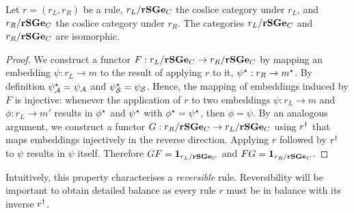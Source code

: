 \begin{lemma}
  Let $r = (r_L, r_R)$ be a rule,
  $r_L/\mathbf{rSGe}_C$ the coslice category under $r_L$, and
  $r_R/\mathbf{rSGe}_C$ the coslice category under $r_R$.
  The categories $r_L/\mathbf{rSGe}_C$ and $r_R/\mathbf{rSGe}_C$ are isomorphic.
\end{lemma}
\begin{proof}
  We construct a functor $F: r_L/\mathbf{rSGe}_C \to r_R/\mathbf{rSGe}_C$
  by mapping an embedding $\psi: r_L \to m$
  to the result of applying $r$ to it,
  $\psi^\star: r_R \to m^\star$.
  By definition $\psi^\star_{\mathcal{A}} = \psi_{\mathcal{A}}$ and
  $\psi^\star_{\mathcal{S}} = \psi_{\mathcal{S}}$.
  Hence, the mapping of embeddings induced by $F$ is injective:
  whenever the application of $r$ to two embeddings
  $\psi: r_L \to m$ and $\phi: r_L \to m'$
  results in $\phi^\star$ and $\psi^\star$
  with $\phi^\star = \psi^\star$,
  then $\phi = \psi$.
  By an analogous argument, we construct a functor
  $G: r_R/\mathbf{rSGe}_C \to r_L/\mathbf{rSGe}_C$ using $r^\dagger$ that
  maps embeddings injectively in the reverse direction.
  Applying $r$ followed by $r^\dagger$ to $\psi$
  results in $\psi$ itself.
  Therefore $GF = \boldsymbol{\mathbf{1}}_{r_L/\mathbf{rSGe}_C}$ and $FG = \boldsymbol{\mathbf{1}}_{r_R/\mathbf{rSGe}_C}$.
\end{proof}

Intuitively, this property characterises a \emph{reversible} rule.
Reversibility will be important to obtain detailed balance as
every rule $r$ must be in balance with its inverse $r^\dagger$.

